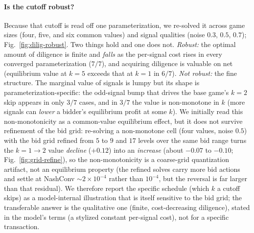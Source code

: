 \documentclass[11pt,a4paper]{article}
\begin{document}
\paragraph{Is the cutoff robust?} Because that cutoff is read off one parameterization,
we re-solved it across game sizes (four, five, and six common values) and signal
qualities (noise $0.3$, $0.5$, $0.7$); Fig.~\ref{fig:dilig-robust}. Two things hold and
one does not. \emph{Robust:} the optimal amount of diligence is finite and \emph{falls}
as the per-signal cost rises in every converged parameterization ($7/7$), and acquiring
diligence is valuable on net (equilibrium value at $k=5$ exceeds that at $k=1$ in
$6/7$). \emph{Not robust:} the fine structure. The marginal value of signals is lumpy
but its shape is parameterization-specific: the odd-signal bump that drives the base
game's $k=2$ skip appears in only $3/7$ cases, and in $3/7$ the value is non-monotone in
$k$ (more signals can \emph{lower} a bidder's equilibrium profit at some $k$). We
initially read this non-monotonicity as a common-value equilibrium effect, but it does
not survive refinement of the bid grid: re-solving a non-monotone cell (four values,
noise $0.5$) with the bid grid refined from $5$ to $9$ and $17$ levels over the same bid
range turns the $k{=}1\!\to\!2$ value \emph{decline} ($+0.12$) into an \emph{increase}
(about $-0.07$ to $-0.10$; Fig.~\ref{fig:grid-refine}), so the non-monotonicity is a
coarse-grid quantization artifact, not an equilibrium property (the refined solves carry
more bid actions and settle at NashConv $\sim$$2\times10^{-4}$ rather than $10^{-4}$, but
the reversal is far larger than that residual). We therefore report the specific schedule
(which $k$ a cutoff skips) as a model-internal illustration that is itself sensitive to
the bid grid; the transferable answer is the qualitative one (finite, cost-decreasing
diligence), stated in the model's terms (a stylized constant per-signal cost), not for a
specific transaction.
\end{document}
